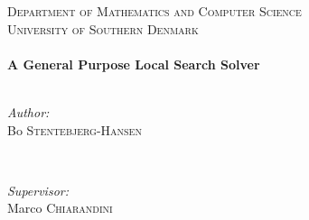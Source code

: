 \begin{center}
 

 
\textsc{\large Department of Mathematics and Computer Science}\\[0.5cm]
\textsc{\large University of Southern Denmark}\\[1.5cm]


\HRule \\[0.4cm]
{ \Huge \bfseries A General Purpose Local Search Solver }\\[0.4cm]
\HRule \\[.5cm]
 

 
\vspace{1cm}
\begin{minipage}{0.45\textwidth}
\begin{flushleft} \Large
\emph{Author:}\\
Bo \textsc{Stentebjerg-Hansen}\\ %
\end{flushleft}
\end{minipage}
~
\begin{minipage}{0.45\textwidth}
\begin{flushright} \Large
\emph{Supervisor:} \\
Marco \textsc{Chiarandini} 
\end{flushright}
\end{minipage}\\[1.5cm]



\end{center}
